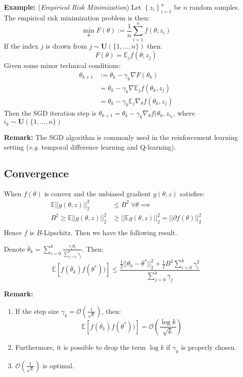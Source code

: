\textbf{Example:} (\textit{Empirical Risk Minimization}) Let $\left\{z_i\right\}_{i=1}^n$ be $n$ random samples. The empirical risk minimization problem is then:
\begin{equation*}
	\min_{\theta} F(\theta) := \frac{1}{n} \sum_{i=1}^n f(\theta; z_i)
\end{equation*}
If the index $j$ is drawn from $j \sim \mathbf{U}(\{1,\dots,n\})$ then:
\begin{equation*}
	F(\theta) = \mathbb{E}_j f(\theta; z_j)
\end{equation*}
Given some minor technical conditions:
\begin{align*}
\theta_{k+1} &:= \theta_k - \gamma_k \nabla F(\theta_k)\\
&= \theta_k - \gamma_k \nabla \mathbb{E}_jf(\theta_k, z_j)\\
&= \theta_k - \gamma_k \mathbb{E}_j \nabla_{\theta} f(\theta_k, z_j)
\end{align*}
Then the SGD iteration step is $\theta_{k+1} = \theta_k - \gamma_k \nabla_{\theta} f(\theta_k, z_{i_k}$, where $i_k  \sim \mathbf{U}(\{1, \dots, n\})$

\noindent \textbf{Remark:}
The SGD algorithm is commonly used in the reinforcement learning setting (\textit{e.g.} temporal difference learning and Q-learning). 

\subsection{Convergence}
When $f(\theta)$ is convex and the unbiased gradient $g(\theta, z)$ satisfies:
\begin{align*}
	\mathbb{E} || g(\theta, z) ||_2^2 &\leq B^2 \; \forall \theta \implies\\
	B^2 \geq \mathbb{E} || g(\theta, z) ||_2^2 &\geq ||\mathbb{E} g(\theta, z) ||_2^2 = ||\partial f(\theta)||_2^2\\
\end{align*}
Hence $f$ is $B$-Lipschitz. Then we have the following result.
\begin{theorem}
	Denote $\bar{\theta}_k= \sum_{i=0}^k \frac{\gamma_i \theta_i}{\sum_{j=0}^k \gamma_j}$. Then: 
	\begin{equation*}
	\mathbb{E}\left[f(\bar{\theta}_k) f(\theta^*))\right] \leq \frac{\frac{1}{2} ||\theta_0 - \theta^*||_2^2 + \frac{1}{2}B^2 \sum_{i=0}^{k}\gamma_i^2}{\sum_{j=0}^k \gamma_j}
	\end{equation*}
\end{theorem}
	\textbf{Remark:}
	\begin{enumerate}
		\item If the step size $\gamma_k= \mathcal{O}\left(\frac{1}{\sqrt{k}}\right)$, then:
		\begin{equation*}
		\mathbb{E}\left[f(\bar{\theta}_k) f(\theta^*))\right] = \mathcal{O}\left(\frac{\log k}{\sqrt{k}}\right)
		\end{equation*}
		\item Furthermore, it is possible to drop the term $\log k$ if $\gamma_k$ is properly chosen. 
		\item $\mathcal{O}(\frac{1}{\sqrt{k}})$ is optimal.
	\end{enumerate}
	
